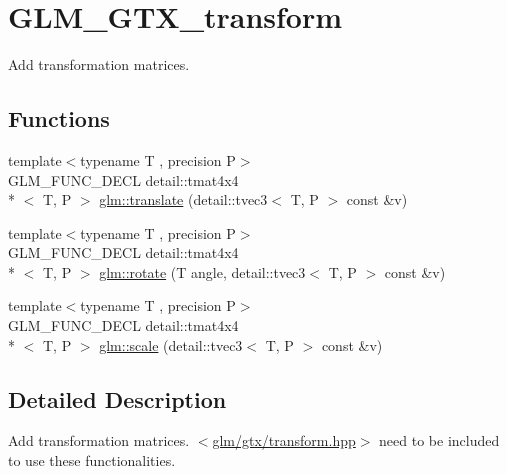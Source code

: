 \hypertarget{group__gtx__transform}{\section{G\-L\-M\-\_\-\-G\-T\-X\-\_\-transform}
\label{group__gtx__transform}
}


Add transformation matrices.  


\subsection*{Functions}
\begin{DoxyCompactItemize}
\item 
{\footnotesize template$<$typename T , precision P$>$ }\\G\-L\-M\-\_\-\-F\-U\-N\-C\-\_\-\-D\-E\-C\-L detail\-::tmat4x4\\*
$<$ T, P $>$ \hyperlink{group__gtx__transform_ga8a2efce0917bf301cc0ea7afb428f688}{glm\-::translate} (detail\-::tvec3$<$ T, P $>$ const \&v)
\item 
{\footnotesize template$<$typename T , precision P$>$ }\\G\-L\-M\-\_\-\-F\-U\-N\-C\-\_\-\-D\-E\-C\-L detail\-::tmat4x4\\*
$<$ T, P $>$ \hyperlink{group__gtx__transform_gaac4ccdbf699a62fe6429005512c0cda5}{glm\-::rotate} (T angle, detail\-::tvec3$<$ T, P $>$ const \&v)
\item 
{\footnotesize template$<$typename T , precision P$>$ }\\G\-L\-M\-\_\-\-F\-U\-N\-C\-\_\-\-D\-E\-C\-L detail\-::tmat4x4\\*
$<$ T, P $>$ \hyperlink{group__gtx__transform_ga80eb26a1eb382b7ab1e3631532d21103}{glm\-::scale} (detail\-::tvec3$<$ T, P $>$ const \&v)
\end{DoxyCompactItemize}


\subsection{Detailed Description}
Add transformation matrices. $<$\hyperlink{transform_8hpp}{glm/gtx/transform.\-hpp}$>$ need to be included to use these functionalities. 

